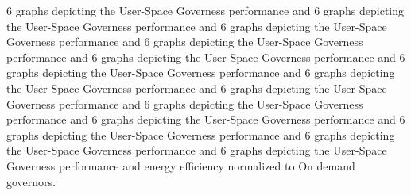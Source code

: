 6 graphs depicting the User-Space Governess performance and 
6 graphs depicting the User-Space Governess performance and 
6 graphs depicting the User-Space Governess performance and 
6 graphs depicting the User-Space Governess performance and 
6 graphs depicting the User-Space Governess performance and 
6 graphs depicting the User-Space Governess performance and 
6 graphs depicting the User-Space Governess performance and 
6 graphs depicting the User-Space Governess performance and 
6 graphs depicting the User-Space Governess performance and 
6 graphs depicting the User-Space Governess performance and 
6 graphs depicting the User-Space Governess performance and 
6 graphs depicting the User-Space Governess performance and 
6 graphs depicting the User-Space Governess performance and 
energy efficiency normalized to On demand governors.

